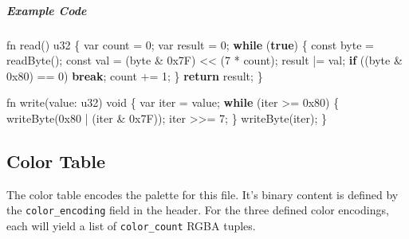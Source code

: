 \documentclass[]{article}
\newenvironment{Shaded}{}{}
\newcommand{\BaseNTok}[1]{\textcolor[rgb]{0.25,0.63,0.44}{#1}}
\newcommand{\DataTypeTok}[1]{\textcolor[rgb]{0.56,0.13,0.00}{#1}}
\newcommand{\DecValTok}[1]{\textcolor[rgb]{0.25,0.63,0.44}{#1}}
\newcommand{\FunctionTok}[1]{\textcolor[rgb]{0.02,0.16,0.49}{#1}}
\newcommand{\KeywordTok}[1]{\textcolor[rgb]{0.00,0.44,0.13}{\textbf{#1}}}
\newcommand{\NormalTok}[1]{#1}
\newcommand{\OperatorTok}[1]{\textcolor[rgb]{0.40,0.40,0.40}{#1}}
\begin{document}
\hypertarget{example-code}{\subparagraph{Example Code}\label{example-code}}

\begin{Shaded}
\begin{Highlighting}[]
\NormalTok{fn }\FunctionTok{read}\OperatorTok{()}\NormalTok{ u32 }\OperatorTok{\{}
    \DataTypeTok{var}\NormalTok{ count }\OperatorTok{=} \DecValTok{0}\OperatorTok{;}
    \DataTypeTok{var}\NormalTok{ result }\OperatorTok{=} \DecValTok{0}\OperatorTok{;}
    \KeywordTok{while} \OperatorTok{(}\KeywordTok{true}\OperatorTok{)} \OperatorTok{\{}
        \DataTypeTok{const} \DataTypeTok{byte} \OperatorTok{=} \FunctionTok{readByte}\OperatorTok{();}
        \DataTypeTok{const}\NormalTok{ val }\OperatorTok{=} \OperatorTok{(}\DataTypeTok{byte} \OperatorTok{\&} \BaseNTok{0x7F}\OperatorTok{)} \OperatorTok{\textless{}\textless{}} \OperatorTok{(}\DecValTok{7} \OperatorTok{*}\NormalTok{ count}\OperatorTok{);}
\NormalTok{        result }\OperatorTok{|=}\NormalTok{ val}\OperatorTok{;}
        \KeywordTok{if} \OperatorTok{((}\DataTypeTok{byte} \OperatorTok{\&} \BaseNTok{0x80}\OperatorTok{)} \OperatorTok{==} \DecValTok{0}\OperatorTok{)}
            \KeywordTok{break}\OperatorTok{;}
\NormalTok{        count }\OperatorTok{+=} \DecValTok{1}\OperatorTok{;}
    \OperatorTok{\}}
    \KeywordTok{return}\NormalTok{ result}\OperatorTok{;}
\OperatorTok{\}}

\NormalTok{fn }\FunctionTok{write}\OperatorTok{(}\NormalTok{value}\OperatorTok{:}\NormalTok{ u32}\OperatorTok{)} \DataTypeTok{void} \OperatorTok{\{}
    \DataTypeTok{var}\NormalTok{ iter }\OperatorTok{=}\NormalTok{ value}\OperatorTok{;}
    \KeywordTok{while} \OperatorTok{(}\NormalTok{iter }\OperatorTok{\textgreater{}=} \BaseNTok{0x80}\OperatorTok{)} \OperatorTok{\{}
        \FunctionTok{writeByte}\OperatorTok{(}\BaseNTok{0x80} \OperatorTok{|} \OperatorTok{(}\NormalTok{iter }\OperatorTok{\&} \BaseNTok{0x7F}\OperatorTok{));}
\NormalTok{        iter }\OperatorTok{\textgreater{}\textgreater{}=} \DecValTok{7}\OperatorTok{;}
    \OperatorTok{\}}
    \FunctionTok{writeByte}\OperatorTok{(}\NormalTok{iter}\OperatorTok{);}
\OperatorTok{\}}
\end{Highlighting}
\end{Shaded}

\hypertarget{color-table}{\subsection{Color Table}\label{color-table}}

The color table encodes the palette for this file. It's binary content
is defined by the \texttt{color\_encoding} field in the header. For the
three defined color encodings, each will yield a list of
\texttt{color\_count} RGBA tuples.
\end{document}
